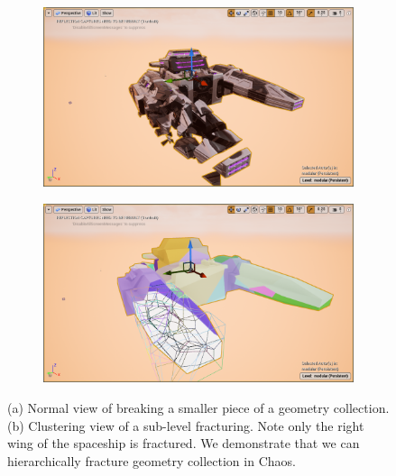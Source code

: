 \documentclass[sigconf]{acmart}
\begin{document}
\begin{figure}
\begin{subfigure}{.5\textwidth}
  \centering
  \includegraphics[width=.9\linewidth]{aaafiles/4.png}
  \caption{}
\end{subfigure}%
\begin{subfigure}{.5\textwidth}
  \centering
  \includegraphics[width=.9\linewidth]{aaafiles/5.png}
  \caption{}
\end{subfigure}
\caption{(a) Normal view of breaking a smaller piece of a geometry collection. (b) Clustering view of a sub-level fracturing. Note only the right wing of the spaceship is fractured. We demonstrate that we can hierarchically fracture geometry collection in Chaos. }
\label{fig:fig}
\end{figure}
\end{document}
